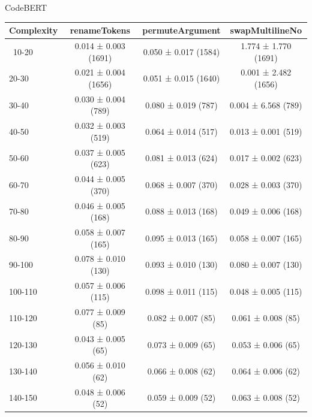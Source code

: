 \documentclass[sigconf,review,anonymous]{acmart}
\begin{document}
  CodeBERT
    {
    \begin{table}[H]
      \small
      \begin{tabular}{l|ccc}
        Complexity          & renameTokens        & permuteArgument     & swapMultilineNo     \\\hline\
        10-20               & 0.014 ± 0.003 (1691)& 0.050 ± 0.017 (1584)& 1.774 ± 1.770 (1691)\\
        20-30               & 0.021 ± 0.004 (1656)& 0.051 ± 0.015 (1640)& 0.001 ± 2.482 (1656)\\
        30-40               & 0.030 ± 0.004 (789) & 0.080 ± 0.019 (787) & 0.004 ± 6.568 (789) \\
        40-50               & 0.032 ± 0.003 (519) & 0.064 ± 0.014 (517) & 0.013 ± 0.001 (519) \\
        50-60               & 0.037 ± 0.005 (623) & 0.081 ± 0.013 (624) & 0.017 ± 0.002 (623) \\
        60-70               & 0.044 ± 0.005 (370) & 0.068 ± 0.007 (370) & 0.028 ± 0.003 (370) \\
        70-80               & 0.046 ± 0.005 (168) & 0.088 ± 0.013 (168) & 0.049 ± 0.006 (168) \\
        80-90               & 0.058 ± 0.007 (165) & 0.095 ± 0.013 (165) & 0.058 ± 0.007 (165) \\
        90-100              & 0.078 ± 0.010 (130) & 0.093 ± 0.010 (130) & 0.080 ± 0.007 (130) \\
        100-110             & 0.057 ± 0.006 (115) & 0.098 ± 0.011 (115) & 0.048 ± 0.005 (115) \\
        110-120             & 0.077 ± 0.009 (85)  & 0.082 ± 0.007 (85)  & 0.061 ± 0.008 (85)  \\
        120-130             & 0.043 ± 0.005 (65)  & 0.073 ± 0.009 (65)  & 0.053 ± 0.006 (65)  \\
        130-140             & 0.056 ± 0.010 (62)  & 0.066 ± 0.008 (62)  & 0.064 ± 0.006 (62)  \\
        140-150             & 0.048 ± 0.006 (52)  & 0.059 ± 0.009 (52)  & 0.063 ± 0.008 (52)  \\
      \end{tabular}
    \end{table}
  }
\end{document}
